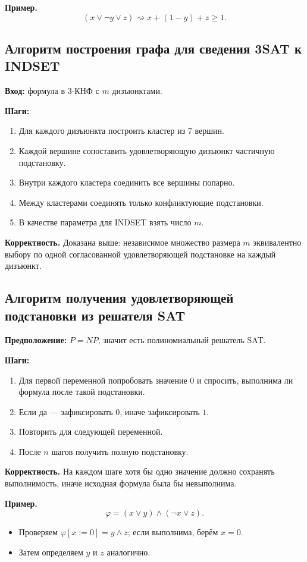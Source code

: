 \documentclass[12pt,a4paper]{article}
\theoremstyle{definition}
\theoremstyle{plain}
\begin{document}
\textbf{Пример.}
\[
(x\vee \neg y\vee z)\rightsquigarrow x+(1-y)+z\ge 1.
\]

\subsection{Алгоритм построения графа для сведения \textsc{3SAT} к \textsc{INDSET}}
\textbf{Вход:} формула в 3-КНФ с $m$ дизъюнктами.

\textbf{Шаги:}
\begin{enumerate}
\item Для каждого дизъюнкта построить кластер из 7 вершин.
\item Каждой вершине сопоставить удовлетворяющую дизъюнкт частичную подстановку.
\item Внутри каждого кластера соединить все вершины попарно.
\item Между кластерами соединять только конфликтующие подстановки.
\item В качестве параметра для \textsc{INDSET} взять число $m$.
\end{enumerate}

\textbf{Корректность.}
Доказана выше: независимое множество размера $m$ эквивалентно выбору по одной согласованной удовлетворяющей подстановке на каждый дизъюнкт.

\subsection{Алгоритм получения удовлетворяющей подстановки из решателя \textsc{SAT}}
\textbf{Предположение:} $P=NP$, значит есть полиномиальный решатель \textsc{SAT}.

\textbf{Шаги:}
\begin{enumerate}
\item Для первой переменной попробовать значение $0$ и спросить, выполнима ли формула после такой подстановки.
\item Если да --- зафиксировать $0$, иначе зафиксировать $1$.
\item Повторить для следующей переменной.
\item После $n$ шагов получить полную подстановку.
\end{enumerate}

\textbf{Корректность.}
На каждом шаге хотя бы одно значение должно сохранять выполнимость, иначе исходная формула была бы невыполнима.

\textbf{Пример.}
\[
\varphi=(x\vee y)\wedge(\neg x\vee z).
\]
\begin{itemize}
\item Проверяем $\varphi[x:=0]=y\wedge z$; если выполнима, берём $x=0$.
\item Затем определяем $y$ и $z$ аналогично.
\end{itemize}
\end{document}
